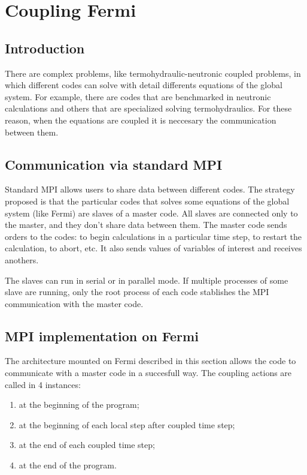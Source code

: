 \chapter{Coupling Fermi}

\section{Introduction}

There are complex problems, like termohydraulic-neutronic coupled problems, in which different codes can solve with detail differents equations of the global system.
For example, there are codes that are benchmarked in neutronic calculations and others that are specialized solving termohydraulics.
For these reason, when the equations are coupled it is neccesary the communication between them.

\section{Communication via standard MPI}

Standard MPI allows users to share data between different codes.
The strategy proposed is that the particular codes that solves some equations of the global system (like Fermi) are slaves of a master code.
All slaves are connected only to the master, and they don't share data between them.
The master code sends orders to the codes: to begin calculations in a particular time step, to restart the calculation, to abort, etc.
It also sends values of variables of interest and receives anothers.

The slaves can run in serial or in parallel mode.
If multiple processes of some slave are running, only the root process of each code stablishes the MPI communication with the master code.

\section{MPI implementation on Fermi}

The architecture mounted on Fermi described in this section allows the code to communicate with a master code in a succesfull way.
The coupling actions are called in 4 instances:
\begin{enumerate}
  \item at the beginning of the program;
  \item at the beginning of each local step after coupled time step;
  \item at the end of each coupled time step;
  \item at the end of the program.
\end{enumerate}

